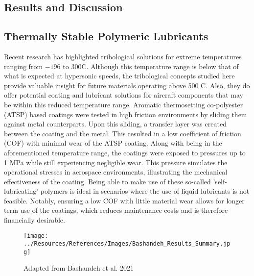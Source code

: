\documentclass[12pt]{article}
\begin{document}
\begin{multicols}{2}
\section{Results and Discussion}

\subsection{Thermally Stable Polymeric Lubricants}

\indent Recent research has highlighted tribological solutions for extreme temperatures ranging from $-196$ to $300$\degree C. Although this temperature range is below that of what is expected at hypersonic speeds, the tribological concepts studied here provide valuable insight for future materials operating above 500 \degree C. Also, they do offer potential coating and lubricant solutions for aircraft components that may be within this reduced temperature range. Aromatic thermosetting co-polyester (ATSP) based coatings were tested in high friction environments by sliding them against metal counterparts. Upon this sliding, a transfer layer was created between the coating and the metal. This resulted in a low coefficient of friction (COF) with minimal wear of the ATSP coating. Along with being in the aforementioned temperature range, the coatings were exposed to pressures up to 1 MPa while still experiencing negligible wear. \citep{Bashandeh2021} This pressure simulates the operational stresses in aerospace environments, illustrating the mechanical effectiveness of the coating. Being able to make use of these so-called 'self-lubricating' polymers is ideal in scenarios where the use of liquid lubricants is not feasible. Notably, ensuring a low COF with little material wear allows for longer term use of the coatings, which reduces maintenance costs and is therefore financially desirable.

\begin{figure}[H]
    \centering
    \texttt{[image: ../Resources/References/Images/Bashandeh\_Results\_Summary.jpg]}
    \caption{\scriptsize{Adapted from Bashandeh et al. 2021 \citep{Bashandeh2021}}}
    \label{fig:Bashandeh-Summary}
\end{figure}


\end{multicols}
\end{document}
